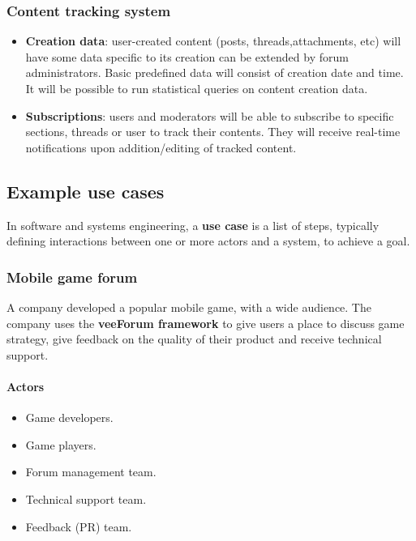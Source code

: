 \documentclass[12pt]{report}
\renewcommand\emph{\textbf}
\begin{document}
                      \subsubsection{Content tracking system}
                        \begin{itemize}
                            \item \emph{Creation data}: user-created content (posts, threads,attachments, etc) will have some data specific to its creation can be extended by forum administrators. Basic predefined data will consist of creation date and time. It will be possible to run statistical queries on content creation data.
                            \item \emph{Subscriptions}: users and moderators will be able to subscribe to specific sections, threads or user to track their contents. They will receive real-time notifications upon addition/editing of tracked content.
                        \end{itemize}

                \subsection{Example use cases}
                    In software and systems engineering, a \emph{use case} is a list of steps, typically defining interactions between one or more actors and a system, to achieve a goal. 

                    \subsubsection{Mobile game forum}
                        A company developed a popular mobile game, with a wide audience.
                        The company uses the \emph{veeForum framework} to give users a place to discuss game strategy, give feedback on the quality of their product and receive technical support.

                        \paragraph{Actors}
                            \begin{itemize}
                                \item Game developers.
                                \item Game players.
                                \item Forum management team.
                                \item Technical support team.
                                \item Feedback (PR) team.
                            \end{itemize}
\end{document}
